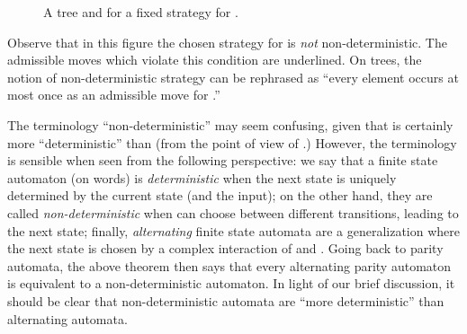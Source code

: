 \begin{figure}[h]
\centering
{}
\caption{A tree  and  for a fixed strategy for \eloise.}
\label{fig:strategies1}
\end{figure}
 
Observe that in this figure the chosen strategy for \eloise is \emph{not} non-deterministic. The admissible moves which violate this condition are underlined. On trees, the notion of non-deterministic strategy can be rephrased as ``every element  occurs at most once as an admissible move for \abelard.''

\begin{remark}
	The terminology ``non-deterministic'' may seem confusing, given that  is certainly more ``deterministic''  than  (from the point of view of \abelard.) However, the terminology is sensible when seen from the following perspective: we say that a finite state automaton (on words) is \emph{deterministic} when the next state is uniquely determined by the current state (and the input); on the other hand, they are called \emph{non-deterministic} when \eloise can choose between different transitions, leading to the next state; finally, \emph{alternating} finite state automata are a generalization where the next state is chosen by a complex interaction of \eloise and \abelard.
Going back to parity automata, the above theorem then says that every alternating parity automaton is equivalent to a non-deterministic automaton. In light of our brief discussion, it should be clear that non-deterministic automata are ``more deterministic'' than alternating automata.
\end{remark}

